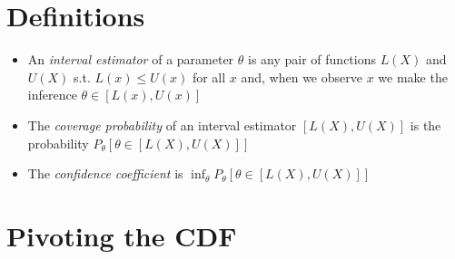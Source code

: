 \section{Definitions}

\begin{itemize}
\item An \emph{interval estimator} of a parameter $θ$ is any pair of
      functions $L(X)$ and $U(X)$ s.t. $L(x) ≤ U(x)$ for all $x$
      and, when we observe $x$ we make the inference $θ ∈
      [L(x), U(x)]$
\item The \emph{coverage probability} of an interval estimator
      $[L(X),U(X)]$ is the probability $P_θ[θ ∈ [L(X), U(X)]]$
\item The \emph{confidence coefficient} is $\inf_θ P_θ[θ ∈ [L(X), U(X)]]$
\end{itemize}

\section{Pivoting the CDF}

